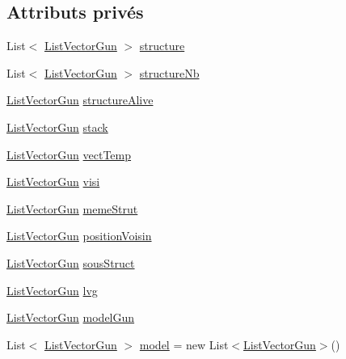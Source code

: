 \subsection*{Attributs privés}
\begin{DoxyCompactItemize}
\item 
List$<$ \mbox{\hyperlink{class_list_vector_gun}{List\+Vector\+Gun}} $>$ \mbox{\hyperlink{class_detection_gun_a886d92d897103cf8ae7f3dbe54ed55d7}{structure}}
\item 
List$<$ \mbox{\hyperlink{class_list_vector_gun}{List\+Vector\+Gun}} $>$ \mbox{\hyperlink{class_detection_gun_aa5c982280cbaf8c059908c47b3295adf}{structure\+Nb}}
\item 
\mbox{\hyperlink{class_list_vector_gun}{List\+Vector\+Gun}} \mbox{\hyperlink{class_detection_gun_ae012efe697f1a4df6a18facda545e0c3}{structure\+Alive}}
\item 
\mbox{\hyperlink{class_list_vector_gun}{List\+Vector\+Gun}} \mbox{\hyperlink{class_detection_gun_a67ad5cfe14f3aa86a93924a04a8c8128}{stack}}
\item 
\mbox{\hyperlink{class_list_vector_gun}{List\+Vector\+Gun}} \mbox{\hyperlink{class_detection_gun_acbb9ba46ef97f0564b86768310799626}{vect\+Temp}}
\item 
\mbox{\hyperlink{class_list_vector_gun}{List\+Vector\+Gun}} \mbox{\hyperlink{class_detection_gun_a4d02fdb9cdc3f07be7f2d840d74fa580}{visi}}
\item 
\mbox{\hyperlink{class_list_vector_gun}{List\+Vector\+Gun}} \mbox{\hyperlink{class_detection_gun_a6a857de3141815652dbddd373919aeba}{meme\+Strut}}
\item 
\mbox{\hyperlink{class_list_vector_gun}{List\+Vector\+Gun}} \mbox{\hyperlink{class_detection_gun_ab51892092361b0108f4d529328cee661}{position\+Voisin}}
\item 
\mbox{\hyperlink{class_list_vector_gun}{List\+Vector\+Gun}} \mbox{\hyperlink{class_detection_gun_ae243d9190ec5bab86ebb0af4bf789151}{sous\+Struct}}
\item 
\mbox{\hyperlink{class_list_vector_gun}{List\+Vector\+Gun}} \mbox{\hyperlink{class_detection_gun_a61b7a92ce8bf0837449e3e98c344ce1c}{lvg}}
\item 
\mbox{\hyperlink{class_list_vector_gun}{List\+Vector\+Gun}} \mbox{\hyperlink{class_detection_gun_a16ab75a168175f740485361be785bfda}{model\+Gun}}
\item 
List$<$ \mbox{\hyperlink{class_list_vector_gun}{List\+Vector\+Gun}} $>$ \mbox{\hyperlink{class_detection_gun_a0c8ad0d86d7f0a02de8a120cffae1337}{model}} = new List$<$\mbox{\hyperlink{class_list_vector_gun}{List\+Vector\+Gun}}$>$()
\end{DoxyCompactItemize}


